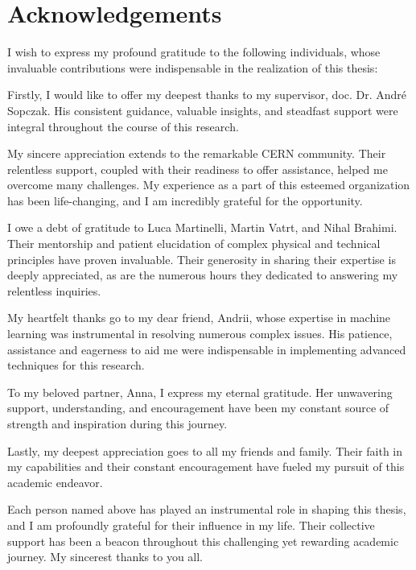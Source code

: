 \chapter*{Acknowledgements}

I wish to express my profound gratitude to the following individuals, whose invaluable contributions were indispensable
in the realization of this thesis:

Firstly, I would like to offer my deepest thanks to my supervisor, doc. Dr. Andr\'{e}\: Sopczak. His consistent
guidance, valuable insights, and steadfast support were integral throughout the course of this research.

My sincere appreciation extends to the remarkable CERN community. Their relentless support, coupled with their
readiness to offer assistance, helped me overcome many challenges. My experience as a part of this esteemed
organization has been life-changing, and I am incredibly grateful for the opportunity.

I owe a debt of gratitude to Luca Martinelli, Martin Vatrt, and Nihal Brahimi. Their mentorship and patient elucidation
of complex physical and technical principles have proven invaluable. Their generosity in sharing their expertise is
deeply appreciated, as are the numerous hours they dedicated to answering my relentless inquiries.

My heartfelt thanks go to my dear friend, Andrii, whose expertise in machine learning was instrumental in resolving
numerous complex issues. His patience, assistance and eagerness to aid me were indispensable in implementing advanced
techniques for this research.

To my beloved partner, Anna, I express my eternal gratitude. Her unwavering support, understanding, and encouragement
have been my constant source of strength and inspiration during this journey.

Lastly, my deepest appreciation goes to all my friends and family. Their faith in my capabilities and their constant
encouragement have fueled my pursuit of this academic endeavor.

Each person named above has played an instrumental role in shaping this thesis, and I am profoundly grateful for their
influence in my life. Their collective support has been a beacon throughout this challenging yet rewarding academic
journey. My sincerest thanks to you all.


